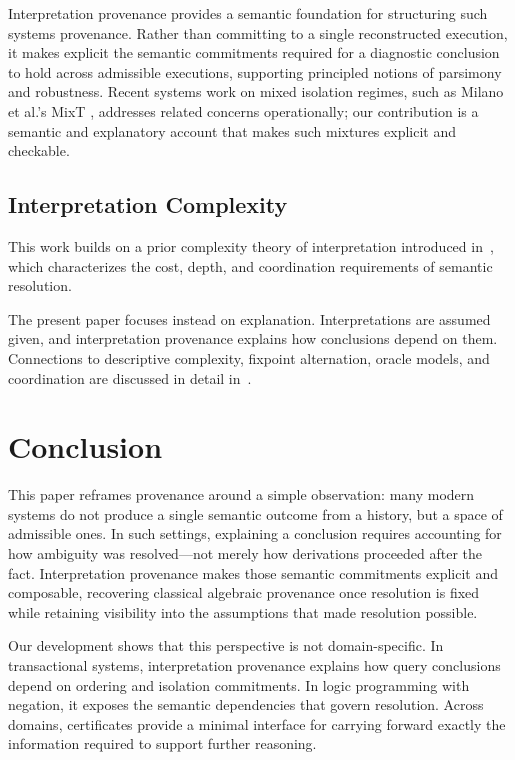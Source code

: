 \documentclass[acmsmall,nonacm]{acmart}
\theoremstyle{remark}
\numberwithin{definition}{section}
\numberwithin{theorem}{section}
\numberwithin{lemma}{section}
\numberwithin{corollary}{section}
\numberwithin{remark}{section}
\numberwithin{example}{section}
\numberwithin{observation}{section}
\numberwithin{assumption}{section}
\begin{document}
Interpretation provenance provides a semantic foundation for structuring such
systems provenance.
Rather than committing to a single reconstructed execution, it makes explicit
the semantic commitments required for a diagnostic conclusion to hold across
admissible executions, supporting principled notions of parsimony and robustness.
Recent systems work on mixed isolation regimes, such as Milano et al.’s MixT
\cite{milano2020mixt}, addresses related concerns operationally; our contribution
is a semantic and explanatory account that makes such mixtures explicit and
checkable.

\subsection{Interpretation Complexity}

This work builds on a prior complexity theory of interpretation
introduced in~\cite{hellerstein2026interpretation}, which characterizes the cost,
depth, and coordination requirements of semantic resolution.

The present paper focuses instead on explanation.
Interpretations are assumed given, and interpretation provenance explains how
conclusions depend on them.
Connections to descriptive complexity, fixpoint alternation, oracle models, and
coordination are discussed in detail in~\cite{hellerstein2026interpretation}.

\section{Conclusion}
\label{sec:conclusion}

This paper reframes provenance around a simple observation: many modern systems do
not produce a single semantic outcome from a history, but a space of admissible
ones.
In such settings, explaining a conclusion requires accounting for how ambiguity
was resolved—not merely how derivations proceeded after the fact.
Interpretation provenance makes those semantic commitments explicit and
composable, recovering classical algebraic provenance once resolution is fixed
while retaining visibility into the assumptions that made resolution possible.

Our development shows that this perspective is not domain-specific.
In transactional systems, interpretation provenance explains how query
conclusions depend on ordering and isolation commitments.
In logic programming with negation, it exposes the semantic dependencies that
govern resolution.
Across domains, certificates provide a minimal interface for carrying forward
exactly the information required to support further reasoning.
\end{document}
